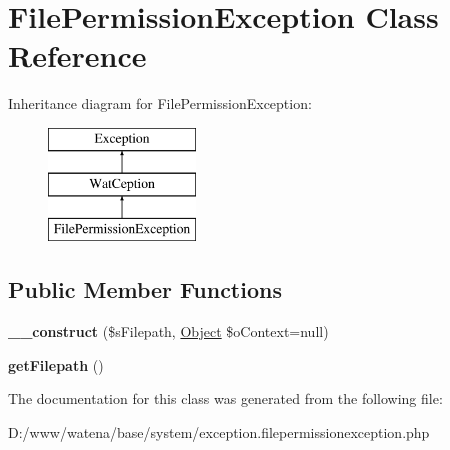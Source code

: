 \hypertarget{class_file_permission_exception}{\section{File\-Permission\-Exception Class Reference}
\label{class_file_permission_exception}
}
Inheritance diagram for File\-Permission\-Exception\-:\begin{figure}[H]
\begin{center}
\leavevmode
\includegraphics[height=3.000000cm]{class_file_permission_exception}
\end{center}
\end{figure}
\subsection*{Public Member Functions}
\begin{DoxyCompactItemize}
\item 
\hypertarget{class_file_permission_exception_a1f29198ea93276a18e2ec2fbe28e25de}{{\bfseries \-\_\-\-\_\-construct} (\$s\-Filepath, \hyperlink{class_object}{Object} \$o\-Context=null)}\label{class_file_permission_exception_a1f29198ea93276a18e2ec2fbe28e25de}

\item 
\hypertarget{class_file_permission_exception_a4d54e40930513ec101fb07a2ff626d15}{{\bfseries get\-Filepath} ()}\label{class_file_permission_exception_a4d54e40930513ec101fb07a2ff626d15}

\end{DoxyCompactItemize}


The documentation for this class was generated from the following file\-:\begin{DoxyCompactItemize}
\item 
D\-:/www/watena/base/system/exception.\-filepermissionexception.\-php\end{DoxyCompactItemize}
